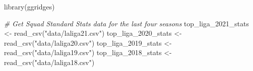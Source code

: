 \documentclass[
  11pt,
]{book}
\newenvironment{Shaded}{\begin{snugshade}}{\end{snugshade}}
\newcommand{\CommentTok}[1]{\textcolor[rgb]{0.56,0.35,0.01}{\textit{#1}}}
\newcommand{\FunctionTok}[1]{\textcolor[rgb]{0.00,0.00,0.00}{#1}}
\newcommand{\NormalTok}[1]{#1}
\newcommand{\OtherTok}[1]{\textcolor[rgb]{0.56,0.35,0.01}{#1}}
\newcommand{\StringTok}[1]{\textcolor[rgb]{0.31,0.60,0.02}{#1}}
\theoremstyle{definition}
\theoremstyle{definition}
\theoremstyle{definition}
\theoremstyle{definition}
\theoremstyle{remark}
\begin{document}
\begin{Shaded}
\begin{Highlighting}[]
\FunctionTok{library}\NormalTok{(ggridges)}

\CommentTok{\# Get \textquotesingle{}Squad Standard Stats\textquotesingle{} data for the last four seasons}
\NormalTok{top\_liga\_2021\_stats }\OtherTok{\textless{}{-}} \FunctionTok{read\_csv}\NormalTok{(}\StringTok{"data/laliga21.csv"}\NormalTok{)}
\NormalTok{top\_liga\_2020\_stats }\OtherTok{\textless{}{-}} \FunctionTok{read\_csv}\NormalTok{(}\StringTok{"data/laliga20.csv"}\NormalTok{)}
\NormalTok{top\_liga\_2019\_stats }\OtherTok{\textless{}{-}} \FunctionTok{read\_csv}\NormalTok{(}\StringTok{"data/laliga19.csv"}\NormalTok{)}
\NormalTok{top\_liga\_2018\_stats }\OtherTok{\textless{}{-}} \FunctionTok{read\_csv}\NormalTok{(}\StringTok{"data/laliga18.csv"}\NormalTok{)}


\end{Highlighting}
\end{Shaded}
\end{document}
